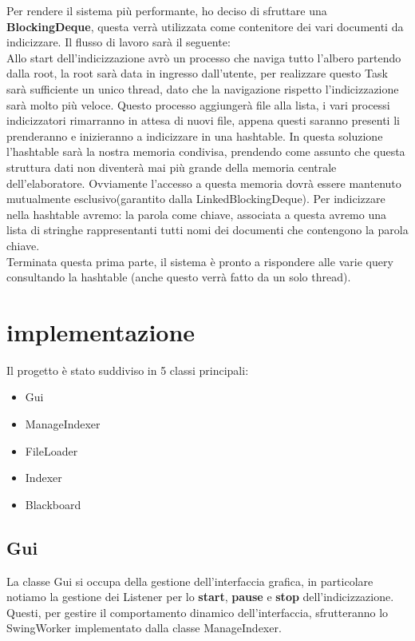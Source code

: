 \documentclass{article}
\begin{document}
Per rendere il sistema più performante, ho deciso di sfruttare una \textbf{BlockingDeque}, questa verrà utilizzata come contenitore dei vari documenti da indicizzare. Il flusso di lavoro sarà il seguente: \\
Allo start dell'indicizzazione avrò un processo che naviga tutto l'albero partendo dalla root, la root sarà data in ingresso dall'utente, per realizzare questo Task sarà sufficiente un unico thread, dato che la navigazione rispetto l'indicizzazione sarà molto più veloce. Questo processo aggiungerà file alla lista, i vari processi indicizzatori rimarranno in attesa di nuovi file, appena questi saranno presenti li prenderanno e inizieranno a indicizzare in una hashtable. In questa soluzione l'hashtable sarà la nostra memoria condivisa, prendendo come assunto che questa struttura dati non diventerà mai più grande della memoria centrale dell'elaboratore. Ovviamente l'accesso a questa memoria dovrà essere mantenuto mutualmente esclusivo(garantito dalla LinkedBlockingDeque).
Per indicizzare nella hashtable avremo: la parola come chiave, associata a questa avremo una lista di stringhe rappresentanti tutti nomi dei documenti che contengono la parola chiave.\\
Terminata questa prima parte, il sistema è pronto a rispondere alle varie query consultando la hashtable (anche questo verrà fatto da un solo thread).

\section{implementazione}
Il progetto è stato suddiviso in 5 classi principali:
\begin{itemize}
  \item Gui
  \item ManageIndexer
  \item FileLoader
  \item Indexer
  \item Blackboard
\end{itemize}

\subsection{Gui}
La classe Gui si occupa della gestione dell'interfaccia grafica, in particolare notiamo la gestione dei Listener per lo \textbf{start}, \textbf{pause} e \textbf{stop} dell'indicizzazione. Questi, per gestire il comportamento dinamico dell'interfaccia, sfrutteranno lo SwingWorker implementato dalla classe ManageIndexer.
\end{document}
